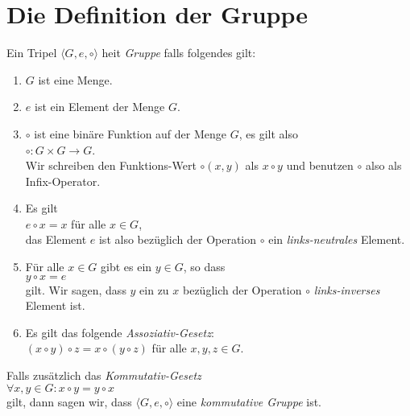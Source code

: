 \section{Die Definition der Gruppe}
\begin{Definition}[Gruppe]
Ein Tripel $\langle G, e, \circ \rangle$ hei\3t {\emph{\color{blue}Gruppe}} falls folgendes gilt:
\begin{enumerate}
\item $G$ ist eine Menge.
\item $e$ ist ein Element der Menge $G$.
\item $\circ$ ist eine bin\"{a}re Funktion auf der Menge $G$, es gilt also
      \\[0.2cm]
      \hspace*{1.3cm}
      $\circ : G \times G \rightarrow G$.
      \\[0.2cm]
      Wir schreiben den Funktions-Wert $\circ(x,y)$ als $x \circ y$ und benutzen
      $\circ$ also als Infix-Operator.
\item Es gilt
      \\
      \hspace*{1.3cm}
      $e \circ x = x$ \quad f\"{u}r alle $x \in G$,
      \\[0.2cm]
      das Element $e$ ist also bez\"{u}glich der Operation $\circ$ ein {\emph{\color{blue}links-neutrales}}
      Element.
\item F\"{u}r alle $x \in G$ gibt es ein $y \in G$, so dass
      \\[0.2cm]
      \hspace*{1.3cm}
      $y \circ x = e$
      \\[0.2cm]
      gilt.  Wir sagen, dass $y$ ein zu $x$ bez\"{u}glich der Operation $\circ$
      {\emph{\color{blue}links-inverses}} Element ist.
\item Es gilt das folgende {\emph{\color{blue}Assoziativ-Gesetz}}:
      \\[0.2cm]
      \hspace*{1.3cm}
      $(x \circ y) \circ z = x \circ (y \circ z)$ \quad f\"{u}r alle $x,y,z \in G$.
\end{enumerate}
Falls zus\"{a}tzlich das {\emph{\color{blue}Kommutativ-Gesetz}}
\\[0.2cm]
\hspace*{1.3cm}
$\forall x, y \in G: x \circ y = y \circ x$
\\[0.2cm]
gilt, dann sagen wir, dass $\langle G, e, \circ \rangle$ eine {\emph{\color{blue}kommutative Gruppe}} ist.
\end{Definition}

